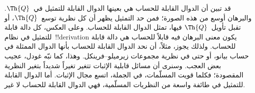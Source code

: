 \documentclass[../../../include/open-logic-section]{subfiles}
\begin{document}
\begin{explain}
قد تبين أن الدوال القابلة للحساب هي بعينها الدوال القابلة للتمثيل
في~$\Th{Q}$. والبرهان أوسع من هذه الصورة؛ فمن حد التمثيل يظهر أن كل نظرية
توسع~$\Th{Q}$، أو تقبل تأويل~$\Th{Q}$ فيها، تمثل الدوال القابلة للحساب.
وعلى العكس، كل دالة قابلة للتمثيل في نظام~!!{derivation} يكون معنى البرهان
فيه قابلاً للحساب هي دالة قابلة للحساب. ولذلك يجوز، مثلاً، أن نحد الدوال
القابلة للحساب بأنها الدوال الممثلة في حساب بيانو، أو حتى في نظرية مجموعات
زيرميلو--فرينكل. وهذا، كما نبّه غودل، عجيب بعض العجب. وسنرى أن مسائل
قابلية الإثبات تتغير تغيراً شديداً بتغير النظرية المقصودة؛ فكلما قويت
المسلّمات، في الجملة، اتسع مجال الإثبات. أما الدوال القابلة للتمثيل في
طائفة واسعة من النظريات المسلّمية، فهي الدوال القابلة للحساب لا غير.
\end{explain}
\end{document}
